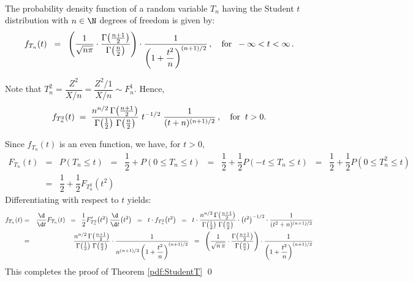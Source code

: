 \documentclass{article}
\begin{document}
\begin{theorem}\label{pdf:StudentT}\mbox{}\\
The probability density function of a random variable $T_{n}$ having the Student $t$ distribution with $n \in \N$ degrees of freedom is given by:
\begin{equation*}
f_{T_{n}}(t) \;\; = \;\;
\left(
\dfrac{1}{\sqrt{n\pi}}\cdot\dfrac{\Gamma\!\left(\frac{n+1}{2}\right)}{\Gamma\!\left(\frac{n}{2}\right)}
\right)
\cdot
\dfrac{1}{\left(1+\dfrac{t^{2}}{n}\right)^{(n+1)/2}}\,,
\quad\textnormal{for}\;\; -\infty < t < \infty\,.
\end{equation*}
\end{theorem}

\proof Note that $T_{n}^{2} = \dfrac{Z^{2}}{X/n} = \dfrac{Z^{2}/1}{X/n} \sim F^{1}_{n}$.  Hence,
\begin{equation*}
f_{T^{2}_{n}}(t) \;=\; \dfrac{n^{n/2}\,\Gamma\!\left(\frac{n+1}{2}\right)}{\Gamma\!\left(\frac{1}{2}\right)\,\Gamma\!\left(\frac{n}{2}\right)}\; t^{-1/2} \; \dfrac{1}{(t+n)^{(n+1)/2}}\,,
\quad\textnormal{for}\;\; t > 0.
\end{equation*}

Since $f_{T_{n}}(t)$ is an even function, we have, for $t  > 0$, 
\begin{eqnarray*}
            F_{T_{n}}(t)
& = &   P(T_{n}\leq t)
\;\;=\;\; \dfrac{1}{2} + P(0\leq T_{n} \leq t)
\;\;=\;\; \dfrac{1}{2} + \dfrac{1}{2}P(-t \leq T_{n} \leq t)
\;\;=\;\; \dfrac{1}{2} + \dfrac{1}{2}P\!\left(0 \leq T_{n}^{2} \leq t\right) \\
& = &   \dfrac{1}{2} + \dfrac{1}{2}F_{T_{n}^{2}}\!\left(t^{2}\right)
\end{eqnarray*}
Differentiating with respect to $t$ yields:
\begin{eqnarray*}
           f_{T_{n}}(t)
& = &   \dfrac{\d}{\d t}F_{T_{n}}(t)
\;\;=\;\; \dfrac{1}{2}F'_{T_{n}^{2}}\!\left(t^{2}\right) \dfrac{\d}{\d t}\!\left(t^{2}\right)
\;\;=\;\; t \cdot f_{T_{n}^{2}}\!\left(t^{2}\right) 
\;\;=\;\; t \cdot
          \dfrac{n^{n/2}\,\Gamma\!\left(\frac{n+1}{2}\right)}{\Gamma\!\left(\frac{1}{2}\right)\,\Gamma\!\left(\frac{n}{2}\right)}
          \cdot \left(t^{2}\right)^{-1/2} \cdot \dfrac{1}{(t^{2}+n)^{(n+1)/2}} \\
& = &  \dfrac{n^{n/2}\,\Gamma\!\left(\frac{n+1}{2}\right)}{\Gamma\!\left(\frac{1}{2}\right)\,\Gamma\!\left(\frac{n}{2}\right)}
           \cdot
           \dfrac{1}{n^{(n+1)/2}\left(1+\dfrac{t^{2}}{n}\right)^{(n+1)/2}} 
\;\;=\;\; \left(
           \dfrac{1}{\sqrt{n\,\pi}}
           \cdot\dfrac{\Gamma\!\left(\frac{n+1}{2}\right)}{\Gamma\!\left(\frac{n}{2}\right)}
           \right)
           \cdot
           \dfrac{1}{\left(1+\dfrac{t^{2}}{n}\right)^{(n+1)/2}}
\end{eqnarray*}
This completes the proof of Theorem \ref{pdf:StudentT}
\qed
\end{document}
